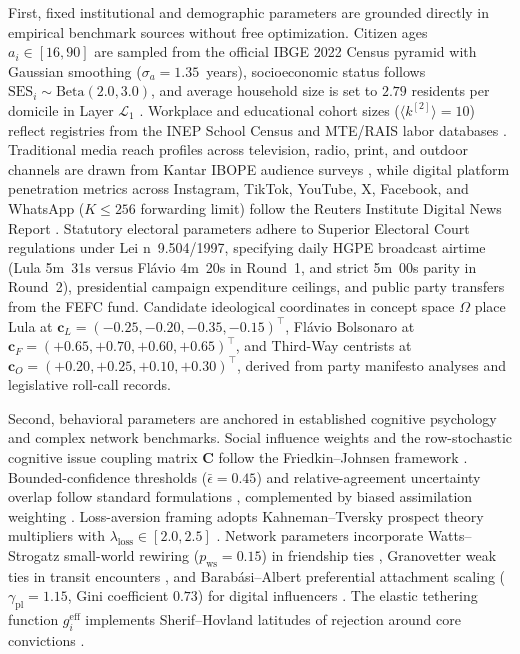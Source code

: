 \documentclass[a4paper,fleqn]{cas-dc}
\begin{document}
First, fixed institutional and demographic parameters are grounded directly in empirical benchmark sources without free optimization. Citizen ages $a_i \in [16, 90]$ are sampled from the official IBGE 2022 Census pyramid with Gaussian smoothing ($\sigma_a = 1.35$~years), socioeconomic status follows $\mathrm{SES}_i \sim \mathrm{Beta}(2.0, 3.0)$, and average household size is set to $2.79$ residents per domicile in Layer $\mathcal{L}_1$ \citep{ibge2022censo}. Workplace and educational cohort sizes ($\langle k^{[2]} \rangle = 10$) reflect registries from the INEP School Census and MTE/RAIS labor databases \citep{inep2023censo, mte2023rais}. Traditional media reach profiles across television, radio, print, and outdoor channels are drawn from Kantar IBOPE audience surveys \citep{kantar2023inside}, while digital platform penetration metrics across Instagram, TikTok, YouTube, X, Facebook, and WhatsApp ($K \le 256$ forwarding limit) follow the Reuters Institute Digital News Report \citep{reuters2023digital}. Statutory electoral parameters adhere to Superior Electoral Court regulations under Lei n\textordmasculine~9.504/1997, specifying daily HGPE broadcast airtime (Lula 5m~31s versus Fl\'avio 4m~20s in Round~1, and strict 5m~00s parity in Round~2), presidential campaign expenditure ceilings, and public party transfers from the FEFC fund. Candidate ideological coordinates in concept space $\Omega$ place Lula at $\mathbf{c}_L = (-0.25, -0.20, -0.35, -0.15)^{\top}$, Fl\'avio Bolsonaro at $\mathbf{c}_F = (+0.65, +0.70, +0.60, +0.65)^{\top}$, and Third-Way centrists at $\mathbf{c}_O = (+0.20, +0.25, +0.10, +0.30)^{\top}$, derived from party manifesto analyses and legislative roll-call records.

Second, behavioral parameters are anchored in established cognitive psychology and complex network benchmarks. Social influence weights and the row-stochastic cognitive issue coupling matrix $\mathbf{C}$ follow the Friedkin--Johnsen framework \citep{friedkin1990social, friedkin2016network}. Bounded-confidence thresholds ($\bar{\epsilon} = 0.45$) and relative-agreement uncertainty overlap follow standard formulations \citep{deffuant2000mixing, deffuant2002how}, complemented by biased assimilation weighting \citep{lord1979biased, dandekar2013biased}. Loss-aversion framing adopts Kahneman--Tversky prospect theory multipliers with $\lambda_{\mathrm{loss}} \in [2.0, 2.5]$ \citep{kahneman1979prospect}. Network parameters incorporate Watts--Strogatz small-world rewiring ($p_{\mathrm{ws}} = 0.15$) in friendship ties \citep{watts1998collective}, Granovetter weak ties in transit encounters \citep{granovetter1973strength}, and Barab\'asi--Albert preferential attachment scaling ($\gamma_{\mathrm{pl}} = 1.15$, Gini coefficient $0.73$) for digital influencers \citep{barabasi1999emergence, bianconi2001competition}. The elastic tethering function $g_i^{\mathrm{eff}}$ implements Sherif--Hovland latitudes of rejection around core convictions \citep{sherif1961social, howe2017attitude}.
\end{document}
